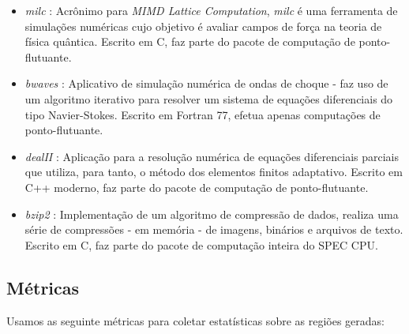 \documentclass[11pt,twoside]{article}
\begin{document}
\begin{itemize}
\item \emph{milc} \cite{milc-url}: Acrônimo para \emph{MIMD Lattice Computation}, \emph{milc} é uma ferramenta de simulações numéricas cujo objetivo é avaliar campos de força na teoria de física quântica. Escrito em C, faz parte do pacote de computação de ponto-flutuante.

\item \emph{bwaves} \cite{bwaves-url}: Aplicativo de simulação numérica de ondas de choque - faz uso de um algoritmo iterativo para resolver um sistema de equações diferenciais do tipo Navier-Stokes. Escrito em Fortran 77, efetua apenas computações de ponto-flutuante.

\item \emph{dealII} \cite{deal-url}: Aplicação para a resolução numérica de equações diferenciais parciais que utiliza, para tanto, o método dos elementos finitos adaptativo. Escrito em C++ moderno, faz parte do pacote de computação de ponto-flutuante.

\item \emph{bzip2} \cite{bzip-url}: Implementação de um algoritmo de compressão de dados, realiza uma série de compressões - em memória - de imagens, binários e arquivos de texto. Escrito em C, faz parte do pacote de computação inteira do SPEC CPU.
\end{itemize}


\subsection{Métricas}
Usamos as seguinte métricas para coletar estatísticas sobre as regiões geradas:
\end{document}

